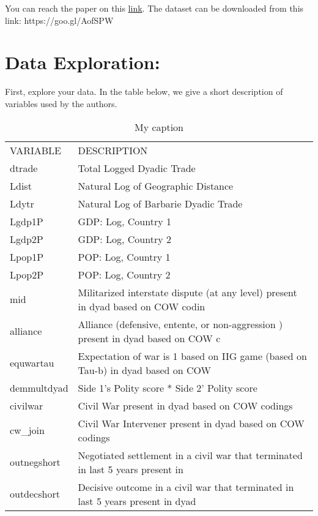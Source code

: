 \documentclass{article}\usepackage[]{graphicx}\usepackage[]{color}
\begin{document}
You can reach the paper on this \href{https://www.dropbox.com/s/xsoyht80qkt0jmo/bayer2004.pdf?dl=0}{link}. The dataset can be downloaded from this link: https://goo.gl/AofSPW

\section*{Data Exploration:}

First, explore your data. In the table below, we give a short description of variables used by the authors.

\begin{table}[]
\centering
\caption{My caption}
\label{my-label}
\begin{tabular}{ll}
VARIABLE    & DESCRIPTION                                                                      \\
dtrade       & Total Logged Dyadic Trade                                               \\
Ldist       & Natural Log of Geographic Distance                                               \\
Ldytr       & Natural Log of Barbarie Dyadic Trade                                             \\
Lgdp1P      & GDP: Log, Country 1                                                              \\
Lgdp2P      & GDP: Log, Country 2                                                              \\
Lpop1P      & POP: Log, Country 1                                                              \\
Lpop2P      & POP: Log, Country 2                                                              \\
mid         & Militarized interstate dispute (at any level) present in dyad based on COW codin \\
alliance    & Alliance (defensive, entente, or non-aggression ) present in dyad based on COW c \\
equwartau   & Expectation of war is 1 based on IIG game (based on Tau-b) in dyad based on COW  \\
demmultdyad & Side 1's Polity score * Side 2' Polity score                                     \\
civilwar    & Civil War present in dyad based on COW codings                                   \\
cw\_join    & Civil War Intervener present in dyad based on COW codings                        \\
outnegshort & Negotiated settlement in a civil war that terminated in last 5 years present in  \\
outdecshort & Decisive outcome in a civil war that terminated in last 5 years present in dyad 
\end{tabular}
\end{table}
\end{document}
